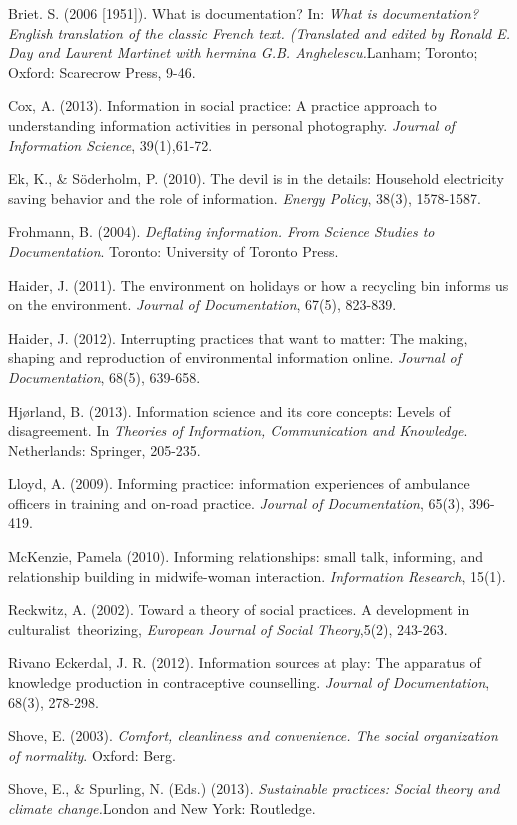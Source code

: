 ﻿\documentclass[a4paper,
fontsize=11pt,
oneside,
numbers=noperiodatend,
parskip=half-,
bibliography=totoc,
final
]{scrartcl}
\begin{document}
Briet. S. (2006 {[}1951{]}). What is documentation? In: \emph{What is
documentation? English translation of the classic French text.
(Translated and edited by Ronald E. Day and Laurent Martinet with
hermina G.B. Anghelescu.}Lanham; Toronto; Oxford: Scarecrow Press,
9-46.~

Cox, A. (2013). Information in social practice: A practice approach to
understanding information activities in personal photography.
\emph{Journal of Information Science}, 39(1),61-72.

Ek, K., \& Söderholm, P. (2010). The devil is in the details: Household
electricity saving behavior and the role of information. \emph{Energy
Policy}, 38(3), 1578-1587.

Frohmann, B. (2004). \emph{Deflating information. From Science Studies
to Documentation}. Toronto: University of Toronto Press.

Haider, J. (2011). The environment on holidays or how a recycling bin
informs us on the environment. \emph{Journal of Documentation}, 67(5),
823-839.

Haider, J. (2012). Interrupting practices that want to matter: The
making, shaping and reproduction of environmental information online.
\emph{Journal of Documentation}, 68(5), 639-658.

Hjørland, B. (2013). Information science and its core concepts: Levels
of disagreement. In \emph{Theories of Information, Communication and
Knowledge}. Netherlands: Springer, 205-235.

Lloyd, A. (2009). Informing practice: information experiences of
ambulance officers in training and on-road practice. \emph{Journal of
Documentation}, 65(3), 396-419.

McKenzie, Pamela (2010). Informing relationships: small talk, informing,
and relationship building in midwife-woman interaction.
\emph{Information Research}, 15(1).

Reckwitz, A. (2002). Toward a theory of social practices. A development
in culturalist~theorizing, \emph{European Journal of Social
Theory},5(2), 243-263.

Rivano Eckerdal, J. R. (2012). Information sources at play: The
apparatus of knowledge production in contraceptive counselling.
\emph{Journal of Documentation}, 68(3), 278-298.

Shove, E. (2003). \emph{Comfort, cleanliness and convenience. The social
organization of normality}. Oxford: Berg.

Shove, E., \& Spurling, N. (Eds.) (2013). \emph{Sustainable practices:
Social theory and climate change.}London and New York: Routledge.
\end{document}
